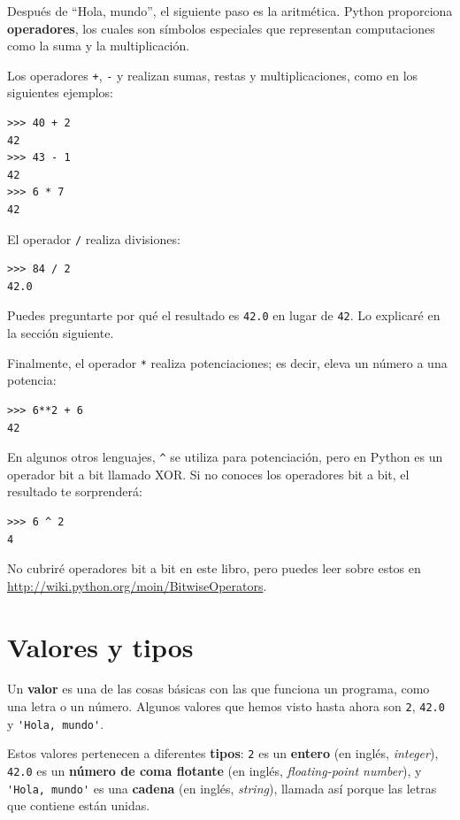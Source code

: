 \documentclass[10pt]{book}
\begin{document}
Después de ``Hola, mundo'', el siguiente paso es la aritmética.  Python
proporciona {\bf operadores}, los cuales son símbolos especiales que
representan computaciones como la suma y la multiplicación.

Los operadores {\tt +}, {\tt -} y {\tt *} realizan sumas,
restas y multiplicaciones, como en los siguientes ejemplos:

\begin{verbatim}
>>> 40 + 2
42
>>> 43 - 1
42
>>> 6 * 7
42
\end{verbatim}
%
El operador {\tt /} realiza divisiones:

\begin{verbatim}
>>> 84 / 2
42.0
\end{verbatim}
%
Puedes preguntarte por qué el resultado es {\tt 42.0} en lugar de {\tt 42}.
Lo explicaré en la sección siguiente.

Finalmente, el operador {\tt **} realiza potenciaciones; es decir,
eleva un número a una potencia:

\begin{verbatim}
>>> 6**2 + 6
42
\end{verbatim}
%
En algunos otros lenguajes, \verb"^" se utiliza para potenciación, pero
en Python es un operador bit a bit llamado XOR.  Si no conoces
los operadores bit a bit, el resultado te sorprenderá:

\begin{verbatim}
>>> 6 ^ 2
4
\end{verbatim}
%
No cubriré
operadores bit a bit en este libro, pero puedes leer sobre
estos en \url{http://wiki.python.org/moin/BitwiseOperators}.


\section{Valores y tipos}

Un {\bf valor} es una de las cosas básicas con las que funciona un programa,
como una letra o un número.  Algunos valores que hemos visto hasta ahora son
{\tt 2}, {\tt 42.0} y \verb"'Hola, mundo'".

Estos valores pertenecen a diferentes {\bf tipos}: {\tt 2} es un {\bf entero}
(en inglés, {\em integer}), {\tt 42.0} es un {\bf número de coma flotante} (en
inglés, {\em floating-point number}), y \verb"'Hola, mundo'" es una {\bf
cadena} (en inglés, {\em string}), llamada así porque las letras que contiene están unidas.
\end{document}
